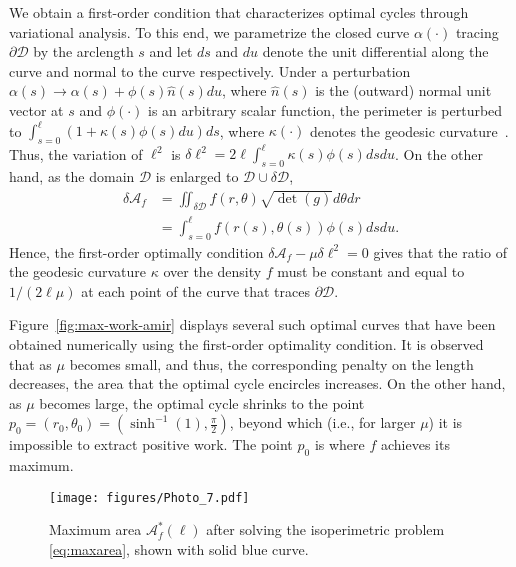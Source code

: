 \documentclass[
 reprint,
superscriptaddress,
 amsmath,amssymb,prl
 aps
]{revtex4-2}
\newcommand{\Area}{{\mathcal A}}
\newcommand{\black}{\color{black}}
\begin{document}
We obtain a first-order condition that characterizes optimal cycles  through variational analysis. To this end, we parametrize the closed curve $\alpha(\cdot)$ tracing $\partial \mathcal D$ by the arclength $s$  and  let $ds$ and $du$ denote the unit differential along the curve and normal to the curve respectively. Under a perturbation $\alpha(s)\to \alpha(s) + \phi(s)\hat n(s)du$, where $\hat n(s)$ is the (outward) normal unit vector at $s$ and $\phi(\cdot)$ is an arbitrary scalar function, the perimeter is perturbed to $\int_{s=0}^\ell (1+\kappa(s) \phi(s)du)ds$, where $\kappa(\cdot)$ denotes the geodesic curvature~\citet{morgan1998riemannian}. Thus, the variation of $\ell^2$ is
$%
\delta \ell^2 = 2\ell \int_{s=0}^\ell \kappa(s)\phi(s) dsdu
$. 
On the other hand, as the domain $\mathcal D$ is enlarged to $\mathcal D\cup\delta \mathcal D$,
\begin{align*}
\delta \Area_f &= \iint_{\delta\mathcal D}f(r,\theta)\sqrt{\det(g)}d\theta dr\\
&= \int_{s=0}^\ell  
f(r(s),\theta(s))\phi(s)dsdu.
\end{align*}
\black
Hence, the first-order optimally condition $\delta \mathcal A_f-\mu\delta \ell^2=0$ gives that the ratio of the geodesic curvature $\kappa$ over the density 
$f$
must be constant and equal to $1/(2\ell \mu)$ at each point of the curve that traces $\partial \mathcal D$.

Figure~\ref{fig:max-work-amir} displays several such optimal curves that have been obtained numerically using the first-order optimality condition. It is observed that as $\mu$ becomes small, and thus, the corresponding penalty on the length decreases,
the area that the optimal cycle encircles increases. On the other hand, as $\mu$ becomes large, the optimal cycle shrinks to the point $p_0=(r_0,\theta_0)=(\sinh^{-1}(1),\frac{\pi}{2})$, beyond which (i.e., for larger $\mu$) it is impossible to extract positive work. The point $p_0$ is where $f$ achieves its maximum. 

\begin{figure}[ht]
     \centering
     \texttt{[image: figures/Photo\_7.pdf]}
     \caption{Maximum area $\mathcal A_f^*(\ell)$ after solving the isoperimetric problem \eqref{eq:maxarea}, shown with solid blue curve. }
     \label{fig:A-lsq}
 \end{figure}
\end{document}
